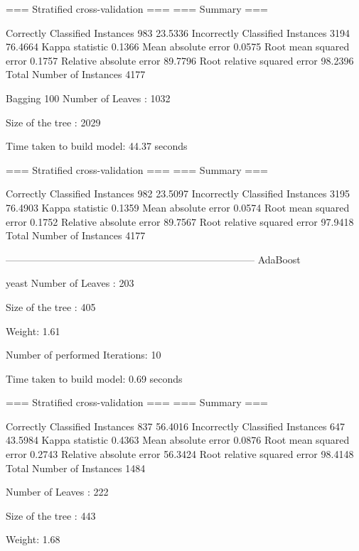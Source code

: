 === Stratified cross-validation ===
=== Summary ===

Correctly Classified Instances         983               23.5336 %
Incorrectly Classified Instances      3194               76.4664 %
Kappa statistic                          0.1366
Mean absolute error                      0.0575
Root mean squared error                  0.1757
Relative absolute error                 89.7796 %
Root relative squared error             98.2396 %
Total Number of Instances             4177


Bagging 100
Number of Leaves  : 	1032

Size of the tree : 	2029




Time taken to build model: 44.37 seconds

=== Stratified cross-validation ===
=== Summary ===

Correctly Classified Instances         982               23.5097 %
Incorrectly Classified Instances      3195               76.4903 %
Kappa statistic                          0.1359
Mean absolute error                      0.0574
Root mean squared error                  0.1752
Relative absolute error                 89.7567 %
Root relative squared error             97.9418 %
Total Number of Instances             4177


--------------------------------------------------------------------------- AdaBoost

yeast 
Number of Leaves  : 	203

Size of the tree : 	405


Weight: 1.61

Number of performed Iterations: 10


Time taken to build model: 0.69 seconds

=== Stratified cross-validation ===
=== Summary ===

Correctly Classified Instances         837               56.4016 %
Incorrectly Classified Instances       647               43.5984 %
Kappa statistic                          0.4363
Mean absolute error                      0.0876
Root mean squared error                  0.2743
Relative absolute error                 56.3424 %
Root relative squared error             98.4148 %
Total Number of Instances             1484


Number of Leaves  : 	222

Size of the tree : 	443


Weight: 1.68

